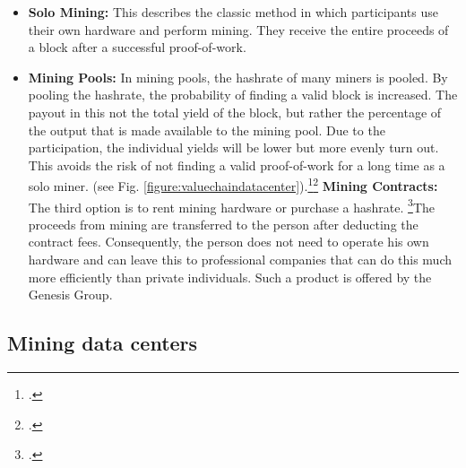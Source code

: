 \begin{itemize}
    \item \textbf{Solo Mining: }This describes the classic method in which participants use their own hardware
    and perform mining. They receive the entire proceeds of a block after a successful proof-of-work.
    \item \textbf{Mining Pools: }In mining pools, the hashrate of many miners is pooled. By pooling the hashrate,
    the probability of finding a valid block is increased. The payout in this
    not the total yield of the block, but rather the percentage of the output that is made available to the mining pool.
    Due to the participation, the individual yields will be lower but more evenly
    turn out. This avoids the risk of not finding a valid proof-of-work for a long time as a solo miner.
    (see Fig. \ref{figure:valuechaindatacenter}).\footcite[Cf.][pp. 58]{bhaskar2015bitcoin}\footcite[Cf.][p. 327]{derks2018chaining}
    \textbf{Mining Contracts: }The third option is to rent mining hardware or purchase a
    hashrate. \footcite[Cf.][pp. 58]{bhaskar2015bitcoin}The proceeds from mining are transferred to the person after deducting the
    contract fees. Consequently, the person does not need to operate his own hardware and can leave this to professional
    companies that can do this much more efficiently than private individuals. Such a product is offered by the
    Genesis Group.
\end{itemize}

\subsection{Mining data centers} \label{toc:miningrechenzentren}

